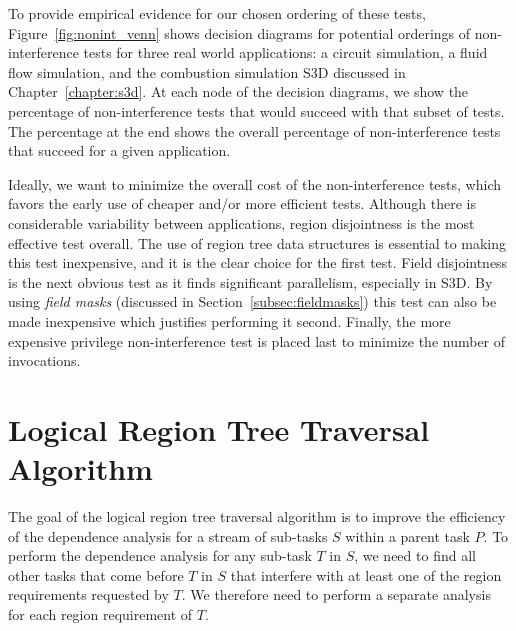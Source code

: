 To provide empirical evidence for our chosen ordering
of these tests, Figure~\ref{fig:nonint_venn} shows decision
diagrams for potential orderings of non-interference
tests for three real world applications: a circuit
simulation, a fluid flow simulation, and the combustion
simulation S3D discussed in Chapter~\ref{chapter:s3d}.
At each node of the decision diagrams, we show the
percentage of non-interference tests that would
succeed with that subset of tests. The percentage at
the end shows the overall percentage of non-interference
tests that succeed for a given application.

Ideally, we want to minimize the overall cost of the 
non-interference tests, which favors the early use 
of cheaper and/or more efficient tests. Although
there is considerable variability between applications,
region disjointness is the most effective test
overall. The use of region tree data structures
is essential to making this test inexpensive, and it
is the clear choice for the first test. Field disjointness
is the next obvious test as it finds significant
parallelism, especially in S3D. By using {\em field
masks} (discussed in Section~\ref{subsec:fieldmasks}) this 
test can also be made inexpensive which justifies 
performing it second. Finally, the more expensive 
privilege non-interference test is placed last to 
minimize the number of invocations.

\section{Logical Region Tree Traversal Algorithm}
\label{sec:logtraversal}

The goal of the logical region tree traversal algorithm
is to improve the efficiency of the dependence
analysis for a stream of sub-tasks $S$ within a
parent task $P$.  To perform the dependence 
analysis for any sub-task $T$ in $S$, we
need to find all other tasks that come before
$T$ in $S$ that interfere with at least one of
the region requirements requested by $T$. We therefore 
need to perform a separate analysis for each 
region requirement of $T$.


